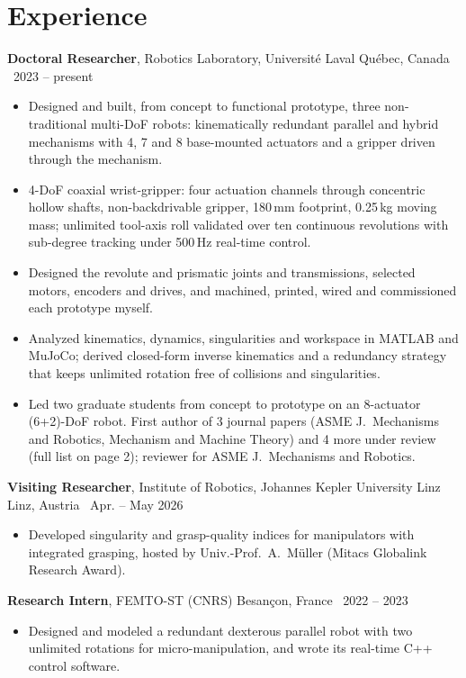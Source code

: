 \documentclass[10pt,letterpaper]{article}
\newcommand{\role}[4]{\textbf{#1}, #2 \hfill {\color{muted}#3 \textbar\ #4}\par}
\begin{document}
\section{Experience}
\role{Doctoral Researcher}{Robotics Laboratory, Universit\'e Laval}{Qu\'ebec, Canada}{2023 -- present}
\begin{itemize}
\item Designed and built, from concept to functional prototype, three non-traditional multi-DoF robots: kinematically
redundant parallel and hybrid mechanisms with 4, 7 and 8 base-mounted actuators and a gripper driven through the mechanism.
\item 4-DoF coaxial wrist-gripper: four actuation channels through concentric hollow shafts, non-backdrivable gripper,
180\,mm footprint, 0.25\,kg moving mass; unlimited tool-axis roll validated over ten continuous revolutions with
sub-degree tracking under 500\,Hz real-time control.
\item Designed the revolute and prismatic joints and transmissions, selected motors, encoders and drives, and machined,
printed, wired and commissioned each prototype myself.
\item Analyzed kinematics, dynamics, singularities and workspace in MATLAB and MuJoCo; derived closed-form inverse
kinematics and a redundancy strategy that keeps unlimited rotation free of collisions and singularities.
\item Led two graduate students from concept to prototype on an 8-actuator (6+2)-DoF robot. First author of 3 journal papers (ASME J.\ Mechanisms and Robotics, Mechanism and Machine Theory) and 4 more
under review (full list on page 2); reviewer for ASME J.\ Mechanisms and Robotics.
\end{itemize}

\vspace{3pt}
\role{Visiting Researcher}{Institute of Robotics, Johannes Kepler University Linz}{Linz, Austria}{Apr. -- May 2026}
\begin{itemize}
\item Developed singularity and grasp-quality indices for manipulators with integrated grasping, hosted by Univ.-Prof.~A.~M\"uller (Mitacs Globalink Research Award).
\end{itemize}

\vspace{3pt}
\role{Research Intern}{FEMTO-ST (CNRS)}{Besan\c{c}on, France}{2022 -- 2023}
\begin{itemize}
\item Designed and modeled a redundant dexterous parallel robot with two unlimited rotations for micro-manipulation, and wrote its real-time C++ control software.
\end{itemize}
\end{document}

